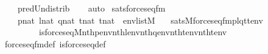 \begin{isabellebody}
\ \ \ \ pred{\isacharunderscore}{\kern0pt}Un{\isacharunderscore}{\kern0pt}distrib\isanewline
\ \ \isamarkupfalse%
\ auto%
\endisatagproof
{\isafoldproof}%
%
\isadelimproof
\isanewline
%
\endisadelimproof
\isanewline
{}\isamarkupfalse%
\ sats{\isacharunderscore}{\kern0pt}forces{\isacharunderscore}{\kern0pt}eq{\isacharprime}{\kern0pt}{\isacharunderscore}{\kern0pt}fm{\isacharcolon}{\kern0pt}\isanewline
\ \ \ \ {\isachardoublequoteopen}p{\isasymin}nat{\isachardoublequoteclose}\ {\isachardoublequoteopen}l{\isasymin}nat{\isachardoublequoteclose}\ {\isachardoublequoteopen}q{\isasymin}nat{\isachardoublequoteclose}\ {\isachardoublequoteopen}t{}{\isasymin}nat{\isachardoublequoteclose}\ {\isachardoublequoteopen}t{}{\isasymin}nat{\isachardoublequoteclose}\ \ {\isachardoublequoteopen}env{\isasymin}list{\isacharparenleft}{\kern0pt}M{\isacharparenright}{\kern0pt}{\isachardoublequoteclose}\isanewline
\ \ \ {\isachardoublequoteopen}sats{\isacharparenleft}{\kern0pt}M{\isacharcomma}{\kern0pt}forces{\isacharunderscore}{\kern0pt}eq{\isacharunderscore}{\kern0pt}fm{\isacharparenleft}{\kern0pt}p{\isacharcomma}{\kern0pt}l{\isacharcomma}{\kern0pt}q{\isacharcomma}{\kern0pt}t{}{\isacharcomma}{\kern0pt}t{}{\isacharparenright}{\kern0pt}{\isacharcomma}{\kern0pt}env{\isacharparenright}{\kern0pt}\ {\isasymlongleftrightarrow}\isanewline
\ \ \ \ \ \ \ \ \ is{\isacharunderscore}{\kern0pt}forces{\isacharunderscore}{\kern0pt}eq{\isacharprime}{\kern0pt}{\isacharparenleft}{\kern0pt}{\isacharhash}{\kern0pt}{\isacharhash}{\kern0pt}M{\isacharcomma}{\kern0pt}nth{\isacharparenleft}{\kern0pt}p{\isacharcomma}{\kern0pt}env{\isacharparenright}{\kern0pt}{\isacharcomma}{\kern0pt}nth{\isacharparenleft}{\kern0pt}l{\isacharcomma}{\kern0pt}env{\isacharparenright}{\kern0pt}{\isacharcomma}{\kern0pt}nth{\isacharparenleft}{\kern0pt}q{\isacharcomma}{\kern0pt}env{\isacharparenright}{\kern0pt}{\isacharcomma}{\kern0pt}nth{\isacharparenleft}{\kern0pt}t{}{\isacharcomma}{\kern0pt}env{\isacharparenright}{\kern0pt}{\isacharcomma}{\kern0pt}nth{\isacharparenleft}{\kern0pt}t{}{\isacharcomma}{\kern0pt}env{\isacharparenright}{\kern0pt}{\isacharparenright}{\kern0pt}{\isachardoublequoteclose}\isanewline
%
\isadelimproof
\ \ %
\endisadelimproof
%
\isatagproof
{}\isamarkupfalse%
\ forces{\isacharunderscore}{\kern0pt}eq{\isacharunderscore}{\kern0pt}fm{\isacharunderscore}{\kern0pt}def\ is{\isacharunderscore}{\kern0pt}forces{\isacharunderscore}{\kern0pt}eq{\isacharprime}{\kern0pt}{\isacharunderscore}{\kern0pt}def\ \isamarkupfalse%

\end{isabellebody}
